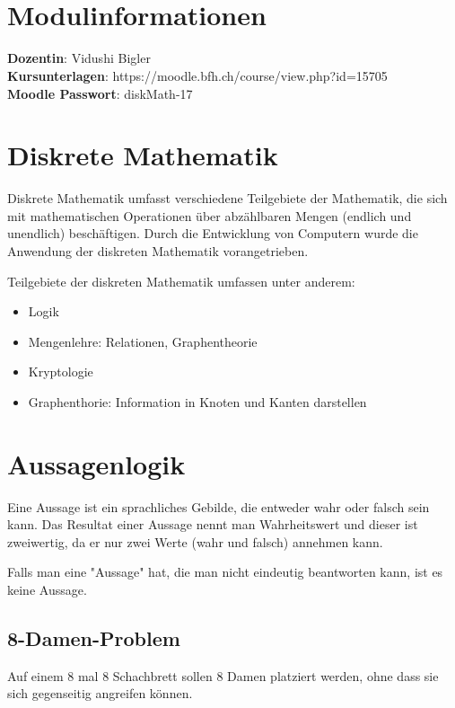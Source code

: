 \documentclass[12pt, a4paper, oneside]{article}
\title{\vspace{-1.5cm}\subjectIdentifier{}\\\subject{}}
\author{\vspace{-1.5cm}}
\date{\vspace{-1.5cm}}
\begin{document}
\maketitle
\thispagestyle{fancy}

\section{Modulinformationen}
{\bf Dozentin}: Vidushi Bigler\\
{\bf Kursunterlagen}: https://moodle.bfh.ch/course/view.php?id=15705\\
{\bf Moodle Passwort}: diskMath-17

\newpage
\section{Diskrete Mathematik}
Diskrete Mathematik umfasst verschiedene Teilgebiete der Mathematik, die sich mit mathematischen Operationen über abzählbaren Mengen (endlich und unendlich) beschäftigen. Durch die Entwicklung von Computern wurde die Anwendung der diskreten Mathematik vorangetrieben.

Teilgebiete der diskreten Mathematik umfassen unter anderem:
\begin{itemize}
  \item Logik
  \item Mengenlehre: Relationen, Graphentheorie
  \item Kryptologie
  \item Graphenthorie: Information in Knoten und Kanten darstellen
\end{itemize}

\newpage
\section{Aussagenlogik}
Eine Aussage ist ein sprachliches Gebilde, die entweder wahr oder falsch sein kann. Das Resultat einer Aussage nennt man Wahrheitswert und dieser ist zweiwertig, da er nur zwei Werte (wahr und falsch) annehmen kann.

Falls man eine "Aussage" hat, die man nicht eindeutig beantworten kann, ist es keine Aussage.

\subsection{8-Damen-Problem}
Auf einem 8 mal 8 Schachbrett sollen 8 Damen platziert werden, ohne dass sie sich gegenseitig angreifen können.
\end{document}

